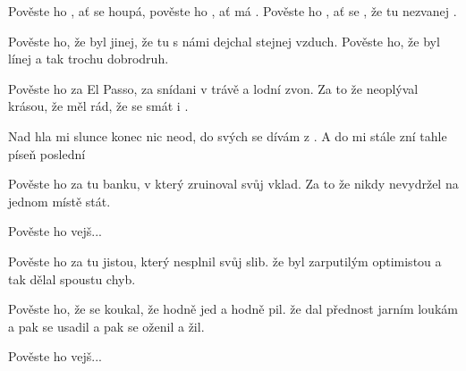 
\zs

Pověste ho , ať se houpá,
pověste ho , ať má .
Pověste ho , ať se ,
že tu  nezvanej .

\ks
\zs

Pověste ho, že byl jinej,
že tu s námi dejchal stejnej vzduch.
Pověste ho, že byl línej
a tak trochu dobrodruh.

\ks
\zs

Pověste ho za El Passo,
za snídani v trávě a lodní zvon.
Za to že neoplýval krásou,
že měl  rád, že se  smát i .

\ks
\zr

Nad hla mi slunce  konec  nic neod,
do svých  se dívám z .
A do  mi stále zní tahle  píseň poslední

\kr
\zs

Pověste ho za tu banku,
v který zruinoval svůj vklad.
Za to že nikdy nevydržel
na jednom místě stát.

\ks
\zr    \kr
\zs

Pověste ho vejš...

\ks
\zs

Pověste ho za tu jistou,
který nesplnil svůj slib.
že byl zarputilým optimistou
a tak dělal spoustu chyb.

\ks
\zs

Pověste ho, že se koukal,
že hodně jed a hodně pil.
že dal přednost jarním loukám
a pak se usadil a pak se oženil
a žil.

\ks
\zs

Pověste ho vejš...

\ks
\kp






